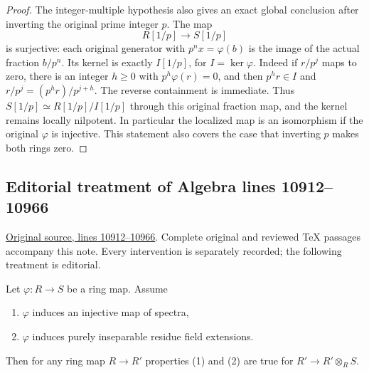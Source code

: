 \begin{proof}
The integer-multiple hypothesis
also gives an exact global conclusion
after inverting the original prime
integer $p$. The map
$$
R[1/p]\longrightarrow S[1/p]
$$
is surjective: each original
generator with $p^n x=\varphi(b)$
is the image of the actual fraction
$b/p^n$. Its kernel is exactly
$I[1/p]$, for $I=\ker\varphi$.
Indeed if $r/p^j$ maps to zero,
there is an integer $h\geq0$
with $p^h\varphi(r)=0$, and then
$p^h r\in I$ and
$r/p^j=(p^h r)/p^{j+h}$.
The reverse containment is immediate.
Thus
$S[1/p]\simeq R[1/p]/I[1/p]$
through this original fraction map,
and the kernel remains locally
nilpotent. In particular the
localized map is an isomorphism
if the original $\varphi$ is
injective. This statement also
covers the case that inverting
$p$ makes both rings zero.
\end{proof}


\subsection{Editorial treatment of Algebra lines 10912--10966}

\hypertarget{algebra-context-132}{}

\noindent\href{https://github.com/stacks/stacks-project/blob/a04446e57ec1fbc252a871afcec7752fb2807b14/algebra.tex\#L10912}{Original source, lines 10912--10966}. Complete original and reviewed TeX passages accompany this note. Every intervention is separately recorded; the following treatment is editorial.


\begin{lemma}
\label{editorial-source-lemma-radicial}
Let $\varphi : R \to S$ be a ring map. Assume
\begin{enumerate}
\item $\varphi$ induces an injective map of spectra,
\item $\varphi$ induces purely inseparable residue field extensions.
\end{enumerate}
Then for any ring map $R \to R'$ properties (1) and (2) are true for
$R' \to R' \otimes_R S$.
\end{lemma}

